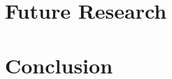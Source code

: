 \documentclass{beamer}
\begin{document}
\section{Future Research}
\label{sec:future-research}


\section{Conclusion}
\label{sec:conclusion}


\end{document}
